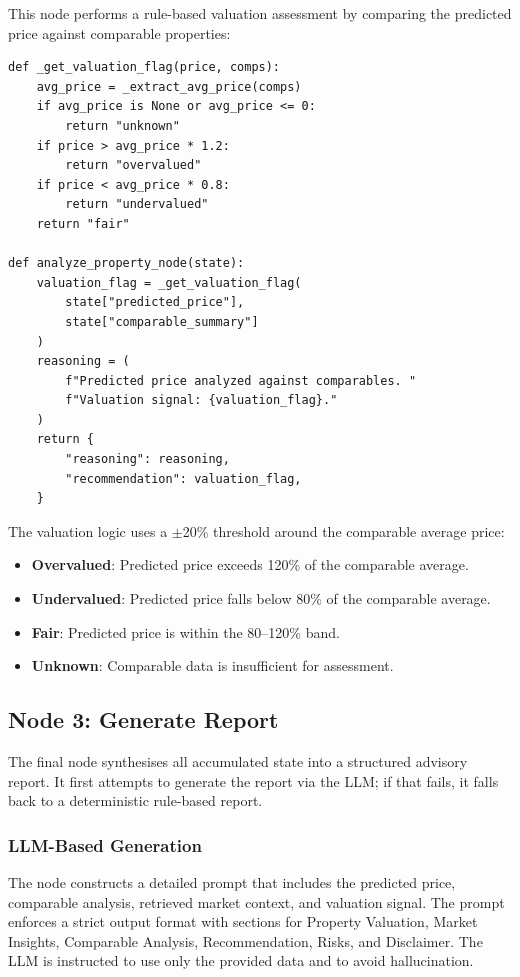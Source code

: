 \documentclass[11pt,a4paper]{article}
\begin{document}
This node performs a rule-based valuation assessment by comparing the predicted price against comparable properties:

\begin{lstlisting}[caption={Analyze property node with valuation logic.}]
def _get_valuation_flag(price, comps):
    avg_price = _extract_avg_price(comps)
    if avg_price is None or avg_price <= 0:
        return "unknown"
    if price > avg_price * 1.2:
        return "overvalued"
    if price < avg_price * 0.8:
        return "undervalued"
    return "fair"

def analyze_property_node(state):
    valuation_flag = _get_valuation_flag(
        state["predicted_price"],
        state["comparable_summary"]
    )
    reasoning = (
        f"Predicted price analyzed against comparables. "
        f"Valuation signal: {valuation_flag}."
    )
    return {
        "reasoning": reasoning,
        "recommendation": valuation_flag,
    }
\end{lstlisting}

The valuation logic uses a $\pm$20\% threshold around the comparable average price:

\begin{itemize}[leftmargin=*]
    \item \textbf{Overvalued}: Predicted price exceeds 120\% of the comparable average.
    \item \textbf{Undervalued}: Predicted price falls below 80\% of the comparable average.
    \item \textbf{Fair}: Predicted price is within the 80--120\% band.
    \item \textbf{Unknown}: Comparable data is insufficient for assessment.
\end{itemize}

\subsection{Node 3: Generate Report}

The final node synthesises all accumulated state into a structured advisory report.
It first attempts to generate the report via the LLM; if that fails, it falls back to a deterministic rule-based report.

\subsubsection{LLM-Based Generation}

The node constructs a detailed prompt that includes the predicted price, comparable analysis, retrieved market context, and valuation signal.
The prompt enforces a strict output format with sections for Property Valuation, Market Insights, Comparable Analysis, Recommendation, Risks, and Disclaimer.
The LLM is instructed to use only the provided data and to avoid hallucination.
\end{document}
